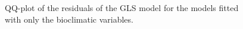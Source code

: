 \begin{figure}
\caption{\label{fig:ResidualGLSBio}QQ-plot of the residuals of the GLS model for the models fitted with only the bioclimatic variables.}
\end{figure}

